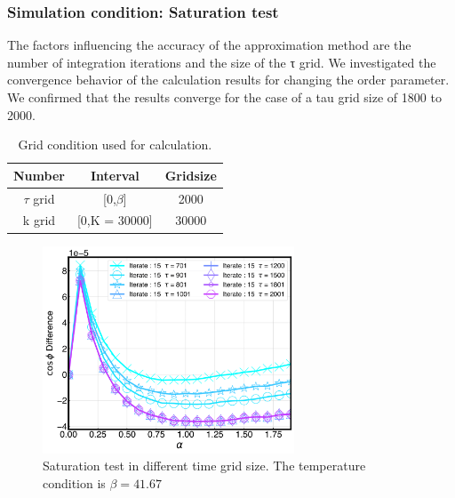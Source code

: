 \documentclass{article}
\begin{document}
\begin{spacing}{1.3}
\subsubsection*{Simulation condition: Saturation test}
The factors influencing the accuracy of the approximation method are the number of integration iterations and the size of the τ grid.
We investigated the convergence behavior of the calculation results for changing the order parameter. 
We confirmed that the results converge for the case of a tau grid size of 1800 to 2000. 
\begin{table}[htbp]
  \centering
  \renewcommand{\arraystretch}{1.2}  %
  \begin{tabular}{@{}ccc@{}}
  \toprule
  \textbf{Number} & \textbf{Interval} & \textbf{Gridsize}\\ 
  \midrule
  $\tau$ grid & [0,$\beta$] & 2000 \\
  k grid & [0,K = 30000] & 30000 \\
  \bottomrule
  \end{tabular}
  \caption{Grid condition used for calculation.}
  \end{table}
\begin{figure}[htbp]
  \centerline{\includegraphics[width=7.5cm]{TexFigure/4/4_2_01_saturation.png}}
  \caption{Saturation test in different time grid size. The temperature condition is $\beta = 41.67$}
\end{figure}
\pagebreak

\end{spacing}
\end{document}
